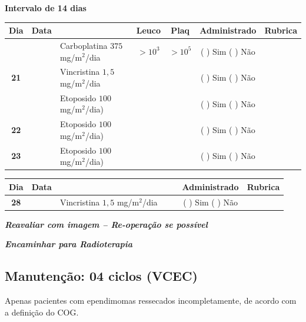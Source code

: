 \documentclass[11pt,a4paper,oldfontcommands]{memoir}
\begin{document}
\begin{center}
\begin{table}[H]
\begin{tabular}{p{1cm}c|p{4cm}|p{2cm}p{2cm}|c|c}
    \hline
\end{tabular}
\end{table}
\textbf{Intervalo de 14 dias}
\begin{table}[H]
\begin{tabular}{p{1cm}c|p{5cm}|p{1.5cm}p{1.5cm}|c|c}
	\hline
	\multicolumn{1}{c|}{\multirow{1}{*}{\textbf{Dia}}}&{Data}&{}&\multicolumn{1}{c|}{Leuco}&\multicolumn{1}{c|}{Plaq}&{Administrado}&{Rubrica} \\
    \hline
    \multicolumn{1}{c|}{\multirow{3}{*}{\textbf{21}}}&\multirow{2}{*}{}&{Carboplatina 3\(75\) mg/m\(^2\)/dia}&\multicolumn{1}{c|}{\(>10^3\)}&\multicolumn{1}{c|}{\(>10^5\)}&{(  ) Sim (  ) Não}&\\
    \cline{4-5}
    \multicolumn{1}{c|}{}&&{Vincristina \(1,5\) mg/m\(^2\)/dia}&\multicolumn{1}{c|}{}&&{(  ) Sim (  ) Não}&\\
    \cline{4-5}
    \multicolumn{1}{c|}{}&{}&{Etoposido \(100\) mg/m\(^2\)/dia)}&{}&&{(  ) Sim (  ) Não}&\\
    \cline{2-3}\cline{6-6}
    \multicolumn{1}{c|}{\textbf{22}}&&{Etoposido \(100\) mg/m\(^2\)/dia)}&&&{(  ) Sim (  ) Não}&\\
    \cline{2-3}\cline{6-6}
    \multicolumn{1}{c|}{\multirow{1}{*}{\textbf{23}}}&&{Etoposido \(100\) mg/m\(^2\)/dia)}&{}&&{(  ) Sim (  ) Não}&\\
    \hline
\end{tabular}
\end{table}
\begin{table}[H]
\begin{tabular}{p{1cm}c|p{4cm}|p{2cm}p{2cm}|c|c}
	\hline
	\multicolumn{1}{c|}{\multirow{1}{*}{\textbf{Dia}}}&{Data}&{}&{}&&{Administrado}&{Rubrica} \\
    \hline
    \multicolumn{1}{c|}{\textbf{28}}&&{Vincristina \(1,5\) mg/m\(^2\)/dia}&\multicolumn{1}{c}{}&&{(  ) Sim (  ) Não}&\\
    \hline
\end{tabular}
\end{table}
\textit{\textbf{Reavaliar com imagem – Re-operação se possível}}

\textit{\textbf{Encaminhar para Radioterapia}}

\end{center}

\subsection{Manutenção: 04 ciclos (VCEC)}
Apenas pacientes com ependimomas ressecados incompletamente, de acordo com a definição do COG.
\end{document}
